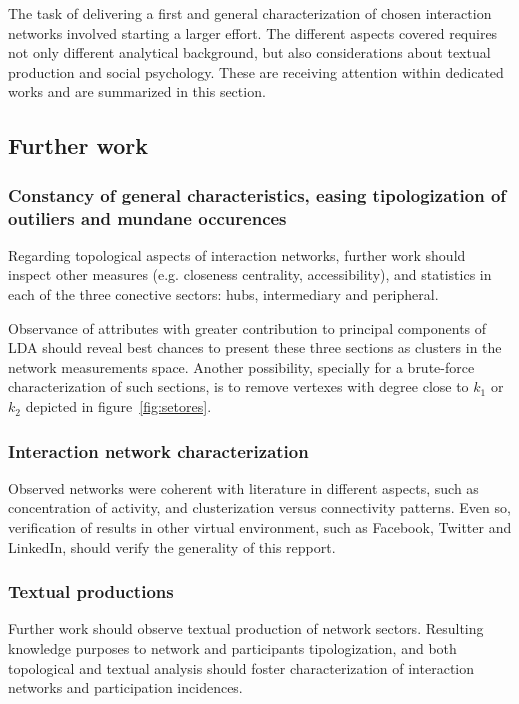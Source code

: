 \documentclass[%
 aip,
 jmp,%
 amsmath,amssymb,
 reprint,%
]{revtex4-1}
\begin{document}
The task of delivering a first and general characterization of chosen interaction networks involved starting a larger effort. The different aspects covered requires not only different analytical background, but also considerations about textual production and social psychology. These are receiving attention within dedicated works and are summarized in this section.

    \subsection{Further work}
        \subsubsection{Constancy of general characteristics, easing tipologization of outiliers and mundane occurences}

Regarding topological aspects of interaction networks, further work should inspect other measures (e.g. closeness centrality, accessibility), and statistics in each of the three conective sectors: hubs, intermediary and peripheral.

 Observance of attributes with greater contribution to principal components of LDA should reveal best chances to present these three sections as clusters in the network measurements space. Another possibility, specially for a brute-force characterization of such sections, is to remove vertexes with degree close to $k_1$ or $k_2$ depicted in figure~\ref{fig:setores}.


        \subsubsection{Interaction network characterization}

Observed networks were coherent with literature in different aspects, such as concentration of activity, and clusterization versus connectivity patterns. Even so, verification of results in other virtual environment, such as Facebook, Twitter and LinkedIn, should verify the generality of this repport. 



        \subsubsection{Textual productions}
Further work should observe textual production of network sectors. Resulting knowledge purposes to network and participants tipologization, and both topological and textual analysis should foster characterization of interaction networks and participation incidences.
\end{document}
